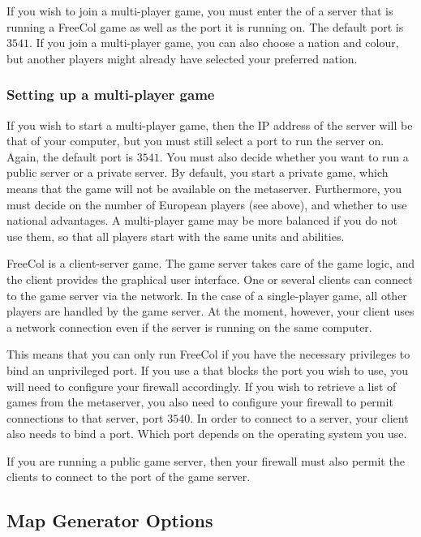 \documentclass[12pt]{book}
\begin{document}
If you wish to join a multi-player game, you must enter the
 of a server that is running a FreeCol game as
well as the port it is running on. The default port is
$3541$. If you join a multi-player game, you can also
choose a nation and colour, but another players might already have
selected your preferred nation.


\hypertarget{Setting up a multi-player game}{\subsubsection{Setting up
    a multi-player game}}

If you wish to start a multi-player game, then the IP address of the
server will be that of your computer, but you must still select a port
to run the server on. Again, the default port is $3541$. You must also
decide whether you want to run a public server or a private server. By
default, you start a private game, which means that the game will not
be available on the metaserver. Furthermore, you must decide on the
number of European players (see above), and whether to use national
advantages. A multi-player game may be more balanced if you do not use
them, so that all players start with the same units and abilities.

FreeCol is a client-server game. The game server takes care of the
game logic, and the client provides the graphical user interface. One
or several clients can connect to the game server via the network. In
the case of a single-player game, all other players are handled by the
game server. At the moment, however, your client uses a network
connection even if the server is running on the same computer.

This means that you can only run FreeCol if you have the necessary
privileges to bind an unprivileged port. If you use a
 that blocks the port you wish to use, you
will need to configure your firewall accordingly. If you wish to
retrieve a list of games from the metaserver, you also need to
configure your firewall to permit connections to that server, port
$3540$. In order to connect to a server, your client also needs to
bind a port. Which port depends on the operating system you use.

If you are running a public game server, then your firewall must also
permit the clients to connect to the port of the game server.


\hypertarget{game generator options}{\subsection{Map Generator Options}}
\end{document}
